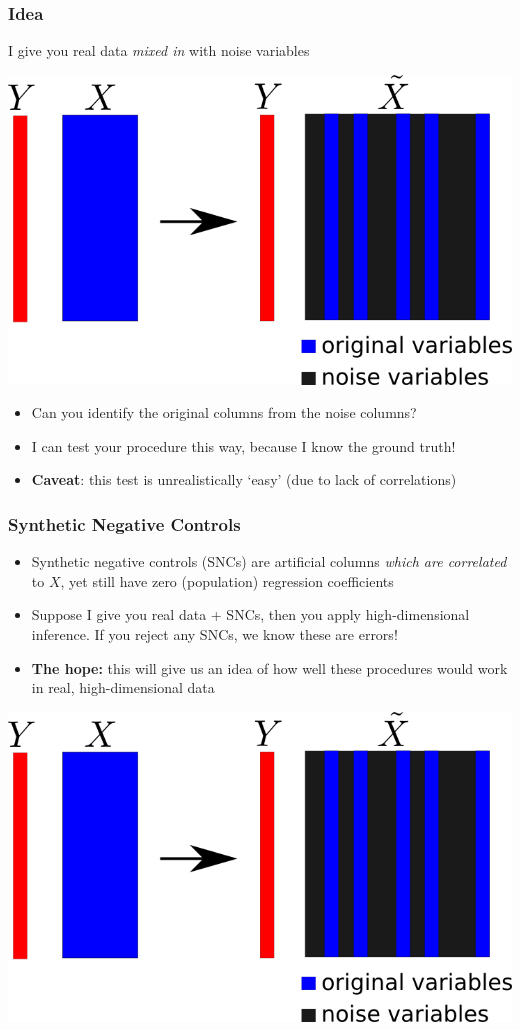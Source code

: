 \documentclass{beamer}
\begin{document}
\begin{frame}
\frametitle{Idea}
I give you real data \emph{mixed in} with noise variables
\begin{center}
\includegraphics[scale = 0.35]{anc.png}
\end{center}
\begin{itemize}
\item<1-> Can you identify the original columns from the noise columns?
\item<2-> I can test your procedure this way, because I know the ground truth!
\item<3-> \textbf{Caveat}: this test is unrealistically `easy' (due to lack of correlations)
\end{itemize}
\end{frame}

\begin{frame}
\frametitle{Synthetic Negative Controls}
\begin{itemize}
\item Synthetic negative controls (SNCs) are artificial columns \emph{which are correlated} to $X$,
yet still have zero (population) regression coefficients
\item Suppose I give you real data + SNCs, then you apply high-dimensional inference.
If you reject any SNCs, we know these are errors!
\item \textbf{The hope:} this will give us an idea of how well these procedures would work in real, high-dimensional data
\end{itemize}
\begin{center}
\includegraphics[scale = 0.35]{anc.png}
\end{center}
\end{frame}
\end{document}
